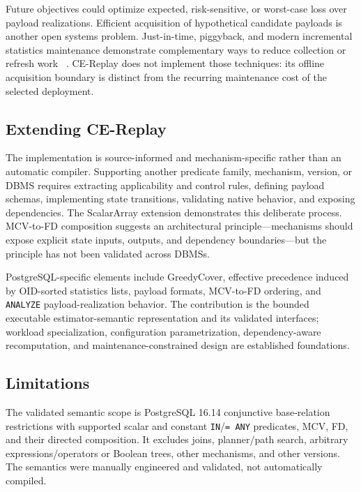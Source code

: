 \documentclass[sigconf,nonacm]{acmart}
\begin{document}
Future objectives could optimize expected, risk-sensitive, or worst-case loss over payload realizations. Efficient acquisition of hypothetical candidate payloads is another open systems problem. Just-in-time, piggyback, and modern incremental statistics maintenance demonstrate complementary ways to reduce collection or refresh work ~\cite{elhelw2007jits,zhu2004piggyback,pfeil2026redshift}. CE-Replay does not implement those techniques: its offline acquisition boundary is distinct from the recurring maintenance cost of the selected deployment.

\subsection{Extending CE-Replay}

The implementation is source-informed and mechanism-specific rather than an automatic compiler. Supporting another predicate family, mechanism, version, or DBMS requires extracting applicability and control rules, defining payload schemas, implementing state transitions, validating native behavior, and exposing dependencies. The ScalarArray extension demonstrates this deliberate process. MCV-to-FD composition suggests an architectural principle---mechanisms should expose explicit state inputs, outputs, and dependency boundaries---but the principle has not been validated across DBMSs.

PostgreSQL-specific elements include GreedyCover, effective precedence induced by OID-sorted statistics lists, payload formats, MCV-to-FD ordering, and \texttt{ANALYZE} payload-realization behavior. The contribution is the bounded executable estimator-semantic representation and its validated interfaces; workload specialization, configuration parametrization, dependency-aware recomputation, and maintenance-constrained design are established foundations.

\subsection{Limitations}

The validated semantic scope is PostgreSQL 16.14 conjunctive base-relation restrictions with supported scalar and constant \texttt{IN}/\texttt{= ANY} predicates, MCV, FD, and their directed composition. It excludes joins, planner/path search, arbitrary expressions/operators or Boolean trees, other mechanisms, and other versions. The semantics were manually engineered and validated, not automatically compiled.
\end{document}
